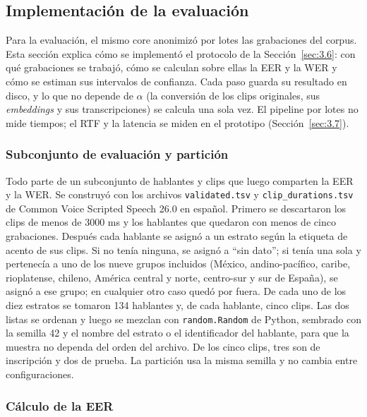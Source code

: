 \documentclass[10pt,twocolumn]{article}
\begin{document}
\subsection{Implementación de la evaluación}\label{sec:4.5}

Para la evaluación, el mismo core anonimizó por lotes las grabaciones del corpus. Esta sección explica cómo se implementó el protocolo de la Sección~\ref{sec:3.6}: con qué grabaciones se trabajó, cómo se calculan sobre ellas la EER y la WER y cómo se estiman sus intervalos de confianza. Cada paso guarda su resultado en disco, y lo que no depende de $\alpha$ (la conversión de los clips originales, sus \textit{embeddings} y sus transcripciones) se calcula una sola vez. El pipeline por lotes no mide tiempos; el RTF y la latencia se miden en el prototipo (Sección~\ref{sec:3.7}).

\subsubsection{Subconjunto de evaluación y partición}\label{sec:4.5.1}

Todo parte de un subconjunto de hablantes y clips que luego comparten la EER y la WER. Se construyó con los archivos \texttt{validated.tsv} y \texttt{clip\_durations.tsv} de Common Voice Scripted Speech 26.0 en español. Primero se descartaron los clips de menos de 3000 ms y los hablantes que quedaron con menos de cinco grabaciones. Después cada hablante se asignó a un estrato según la etiqueta de acento de sus clips. Si no tenía ninguna, se asignó a ``sin dato''; si tenía una sola y pertenecía a uno de los nueve grupos incluidos (México, andino-pacífico, caribe, rioplatense, chileno, América central y norte, centro-sur y sur de España), se asignó a ese grupo; en cualquier otro caso quedó por fuera. De cada uno de los diez estratos se tomaron 134 hablantes y, de cada hablante, cinco clips. Las dos listas se ordenan y luego se mezclan con \texttt{random.Random} de Python, sembrado con la semilla 42 y el nombre del estrato o el identificador del hablante, para que la muestra no dependa del orden del archivo. De los cinco clips, tres son de inscripción y dos de prueba. La partición usa la misma semilla y no cambia entre configuraciones.

\subsubsection{Cálculo de la EER}\label{sec:4.5.2}
\end{document}
